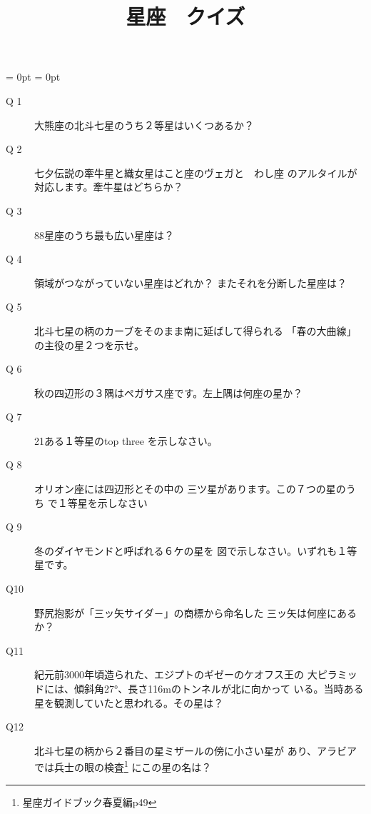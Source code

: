 \documentclass[fleqn]{article}
\begin{document}
\title{星座　クイズ　}
\maketitle
\hoffset = 0pt
\voffset = 0pt
\topmargin=0pt
\textheight=21cm
\headheight=0pt
\headsep=0pt
\newcommand{\CHo}{\makebox(0,0){$\bullet$}}
\newcommand{\CHc}{\makebox(0,0){$\circ$}}
\newcommand{\CHb}{\makebox(0,0){$\bigcirc$}}


\renewcommand{\descriptionlabel}[1]
{\hspace{\labelsep}\textsf{#1}}
\begin{description}
\item[Q 1]{大熊座の北斗七星のうち２等星はいくつあるか？}

\item[Q 2]{七夕伝説の牽牛星と織女星はこと座のヴェガと　わし座
のアルタイルが対応します。牽牛星はどちらか？
}
\item[Q 3]{88星座のうち最も広い星座は？}

\item[Q 4]{領域がつながっていない星座はどれか？
またそれを分断した星座は？
}

\item[Q 5]{北斗七星の柄のカーブをそのまま南に延ばして得られる
「春の大曲線」の主役の星２つを示せ。}

\item[Q 6]{秋の四辺形の３隅はペガサス座です。左上隅は何座の星か？}


\item[Q 7]{21ある１等星のtop three を示しなさい。}

\item[Q 8]{
オリオン座には四辺形とその中の
三ツ星があります。この７つの星のうち
で１等星を示しなさい}

\item[Q 9]{冬のダイヤモンドと呼ばれる６ケの星を
図で示しなさい。いずれも１等星です。

}
\item[Q10]{野尻抱影が「三ッ矢サイダ－」の商標から命名した
三ッ矢は何座にあるか？

}

\item[Q11]{紀元前3000年頃造られた、エジプトのギゼーのケオフス王の
大ピラミッドには、傾斜角27°、長さ116mのトンネルが北に向かって
いる。当時ある星を観測していたと思われる。その星は？


}


\item[Q12]{北斗七星の柄から２番目の星ミザールの傍に小さい星が
あり、アラビアでは兵士の眼の検査\footnote{
星座ガイドブック春夏編p49} にこの星の名は？
}


\end{description}
\end{document}
